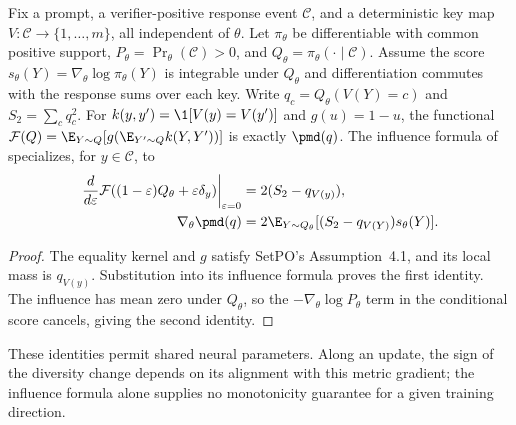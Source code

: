 \begin{corollary}
\enforcehalffinalproseline
\label{cor:pcmd-setpo-neural}
Fix a prompt, a verifier-positive response event $\mathcal C$, and a
deterministic key map $V:\mathcal C\to\{1,\ldots,m\}$, all independent
of $\theta$. Let $\pi_\theta$ be differentiable with common positive support,
$P_\theta=\Pr_\theta(\mathcal C)>0$, and
$Q_\theta=\pi_\theta(\cdot\mid\mathcal C)$. Assume the score
$s_\theta(Y)=\nabla_\theta\log\pi_\theta(Y)$ is integrable under $Q_\theta$
and differentiation commutes with the response sums over each key.
Write $q_c=Q_\theta(V(Y)=c)$ and $S_2=\sum_cq_c^2$.
For $k(y,y')=\1[V(y)=V(y')]$ and $g(u)=1-u$, the functional
$\mathcal F(Q)=\E_{Y\sim Q}[g(\E_{Y'\sim Q}k(Y,Y'))]$ is exactly
$\pmd(q)$. The influence formula of
\citet[Theorem~4.2, v1]{li2026setpo} specializes, for $y\in\mathcal C$, to
\begin{align}
 \left.\frac{d}{d\varepsilon}
  \mathcal F((1-\varepsilon)Q_\theta+\varepsilon\delta_y)
  \right|_{\varepsilon=0}
 &=2(S_2-q_{V(y)}),\label{eq:pcmd-setpo-influence}\\
 \nabla_\theta\pmd(q)
 &=2\E_{Y\sim Q_\theta}
       [(S_2-q_{V(Y)})s_\theta(Y)].
 \label{eq:pcmd-neural-gradient}
\end{align}
\end{corollary}
\begin{proof}
\enforcehalffinalproseline
The equality kernel and $g$ satisfy SetPO's Assumption~4.1, and its local
mass is $q_{V(y)}$. Substitution into its influence formula proves the first
identity. The influence has mean zero under $Q_\theta$, so the
$-\nabla_\theta\log P_\theta$ term in the conditional score cancels,
giving the second identity.
\end{proof}
These identities permit shared neural parameters. Along an update, the
sign of the diversity change depends on its alignment with this metric
gradient; the influence formula alone supplies no monotonicity guarantee
for a given training direction.

